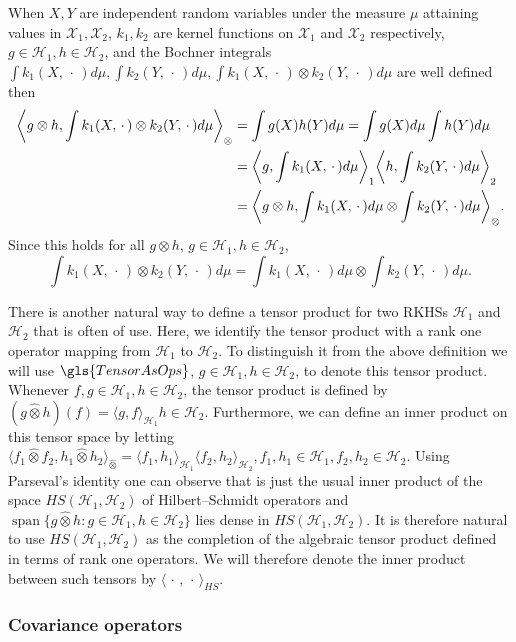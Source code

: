 \documentclass[10pt]{amsart}
\theoremstyle{definition}\newtheorem{defi}[theo]{Definition}\newtheorem{rema}[theo]{Remark}\newtheorem{exam}[theo]{Example}\newtheorem{exem}[theo]{Example}\newtheorem{nota}[theo]{Notation}
\theoremstyle{remark}
\DeclareMathOperator{\spn}{span}
\newcommand{\X}{\mathcal{X}}
\newcommand{\cH}{\mathcal{H}}
\let\originalleft\left
\let\originalright\right
\renewcommand{\left}{\mathopen{}\mathclose\bgroup\originalleft}
\renewcommand{\right}{\aftergroup\egroup\originalright}
\begin{document}
When $X,Y$ are independent random variables under the measure $\mu$ attaining values in $\X_1, \X_2$, $k_1,k_2$ are kernel functions on $\X_1$ and $\X_2$ respectively, $g\in \cH_1, h \in \cH_2$, and the Bochner integrals $\int k_1(X,\,\cdot\,) d\mu, \int k_2(Y,\,\cdot\,) d\mu, \int k_1(X,\,\cdot\,) \otimes k_2(Y,\,\cdot\,) d\mu$ are well defined then
\begin{align*}
\left\langle g\otimes h, \int k_1(X,\,\cdot\,) \otimes k_2(Y,\,\cdot\,) d\mu \right\rangle_\otimes
&= \int g(X) h(Y)  d\mu = \int g(X)d\mu \int h(Y)  d\mu\\
&= \left\langle g, \int k_1(X,\,\cdot\,) d\mu \right\rangle_1 \left\langle h, \int k_2(Y,\,\cdot\,) d\mu \right\rangle_2\\
&= \left\langle g \otimes h, \int k_1(X,\,\cdot\,) d\mu \otimes \int k_2(Y,\,\cdot\,) d\mu \right\rangle_\otimes.
\end{align*}
Since this holds for all $g\otimes h$, $g\in \cH_1, h \in \cH_2$,
\begin{equation}\label{eq:tensor_ind}
\int k_1(X,\,\cdot\,) \otimes k_2(Y,\,\cdot\,) d\mu = \int k_1(X,\,\cdot\,) d\mu \otimes \int k_2(Y,\,\cdot\,) d\mu.
\end{equation}

There is another natural way to define a tensor product for two RKHSs $\cH_1$ and $\cH_2$ that is often of use. Here, we identify the tensor product with a rank one operator mapping from $\cH_1$ to $\cH_2$. To distinguish it from the above definition we will use $\gls{TensorAsOps}$, $g\in \cH_1, h\in \cH_2$, to denote this tensor product. Whenever $f,g \in \cH_1, h\in \cH_2$, the tensor product is defined by $(g \widehat \otimes h)(f) = \langle g,f \rangle_{\cH_1} h \in \cH_2$. Furthermore, we can define an inner product on this tensor space by letting $\langle f_1 \widehat \otimes f_2, h_1 \widehat \otimes h_2 \rangle_{\widehat \otimes} = \langle f_1, h_1 \rangle_{\cH_1} \langle f_2,h_2 \rangle_{\cH_2}, f_1,h_1 \in \cH_1, f_2,h_2 \in \cH_2$. Using Parseval's identity one can observe that is just the usual inner product of the space $HS(\cH_1,\cH_2)$ of Hilbert--Schmidt operators and $\spn \{g\widehat \otimes h: g \in \cH_1,h \in \cH_2 \}$ lies dense in $HS(\cH_1,\cH_2)$. It is therefore natural to use $HS(\cH_1,\cH_2)$ as the completion of the algebraic tensor product defined in terms of rank one operators. We will therefore denote the inner product between such tensors by $\langle \,\cdot\,,\,\cdot\,\rangle_{HS}$.


\subsubsection{Covariance operators}
\end{document}
